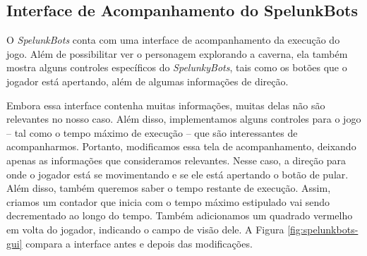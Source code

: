 \subsection{\label{sub:spelunkbots-gui}Interface de Acompanhamento do
SpelunkBots}

O \textit{SpelunkBots} conta com uma interface de acompanhamento da execução do
jogo. Além de possibilitar ver o personagem explorando a caverna, ela também
mostra alguns controles específicos do \textit{SpelunkyBots}, tais como os
botões que o jogador está apertando, além de algumas informações de direção.

Embora essa interface contenha muitas informações, muitas delas não são
relevantes no nosso caso. Além disso, implementamos alguns controles para o
jogo -- tal como o tempo máximo de execução -- que são interessantes de
acompanharmos. Portanto, modificamos essa tela de acompanhamento, deixando
apenas as informações que consideramos relevantes. Nesse caso, a direção para
onde o jogador está se movimentando e se ele está apertando o botão de pular.
Além disso, também queremos saber o tempo restante de execução. Assim, criamos
um contador que inicia com o tempo máximo estipulado vai sendo decrementado ao
longo do tempo. Também adicionamos um quadrado vermelho em volta do jogador,
indicando o campo de visão dele. A Figura \ref{fig:spelunkbots-gui} compara a
interface antes e depois das modificações.

